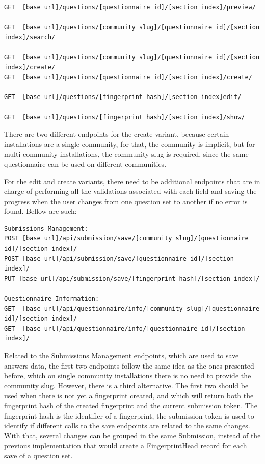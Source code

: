 \begin{lstlisting}[basicstyle=\tiny]
GET  [base url]/questions/[questionnaire id]/[section index]/preview/

GET  [base url]/questions/[community slug]/[questionnaire id]/[section index]/search/

GET  [base url]/questions/[community slug]/[questionnaire id]/[section index]/create/
GET  [base url]/questions/[questionnaire id]/[section index]/create/

GET  [base url]/questions/[fingerprint hash]/[section index]edit/

GET  [base url]/questions/[fingerprint hash]/[section index]/show/
\end{lstlisting}

There are two different endpoints for the create variant, because certain installations are a single community, for that, the community is implicit, but for multi-community installations, the community slug is required, since the same questionnaire can be used on different communities.

For the edit and create variants, there need to be additional endpoints that are in charge of performing all the validations associated with each field and saving the progress when the user changes from one question set to another if no error is found.
Bellow are such:

\begin{lstlisting}[basicstyle=\scriptsize]
Submissions Management:
POST [base url]/api/submission/save/[community slug]/[questionnaire id]/[section index]/
POST [base url]/api/submission/save/[questionnaire id]/[section index]/
PUT [base url]/api/submission/save/[fingerprint hash]/[section index]/

Questionnaire Information:
GET  [base url]/api/questionnaire/info/[community slug]/[questionnaire id]/[section index]/
GET  [base url]/api/questionnaire/info/[questionnaire id]/[section index]/
\end{lstlisting}

Related to the Submissions Management endpoints, which are used to save answers data, the first two endpoints follow the same idea as the ones presented before, which on single community installations there is no need to provide the community slug.
However, there is a third alternative.
The first two should be used when there is not yet a fingerprint created, and which will return both the fingerprint hash of the created fingerprint and the current submission token.
The fingerprint hash is the identifier of a fingerprint, the submission token is used to identify if different calls to the save endpoints are related to the same changes.
With that, several changes can be grouped in the same Submission, instead of the previous implementation that would create a FingerprintHead record for each save of a question set.

